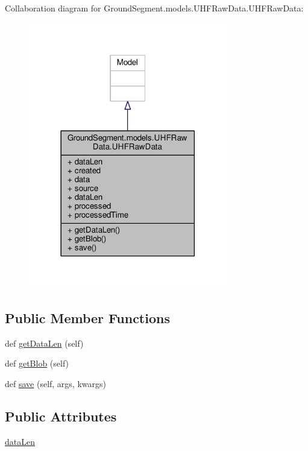 Collaboration diagram for Ground\+Segment.\+models.\+U\+H\+F\+Raw\+Data.\+U\+H\+F\+Raw\+Data\+:\nopagebreak
\begin{figure}[H]
\begin{center}
\leavevmode
\includegraphics[width=246pt]{class_ground_segment_1_1models_1_1_u_h_f_raw_data_1_1_u_h_f_raw_data__coll__graph}
\end{center}
\end{figure}
\subsection*{Public Member Functions}
\begin{DoxyCompactItemize}
\item 
def \hyperlink{class_ground_segment_1_1models_1_1_u_h_f_raw_data_1_1_u_h_f_raw_data_a7aa5473e76f0b6f3784b74d58a1a3882}{get\+Data\+Len} (self)
\item 
def \hyperlink{class_ground_segment_1_1models_1_1_u_h_f_raw_data_1_1_u_h_f_raw_data_a80c5fc99c33923e60a09ed948c70f1eb}{get\+Blob} (self)
\item 
def \hyperlink{class_ground_segment_1_1models_1_1_u_h_f_raw_data_1_1_u_h_f_raw_data_a0ffa42aeb51aede4dba8bf88afa8e6b8}{save} (self, args, kwargs)
\end{DoxyCompactItemize}
\subsection*{Public Attributes}
\begin{DoxyCompactItemize}
\item 
\hyperlink{class_ground_segment_1_1models_1_1_u_h_f_raw_data_1_1_u_h_f_raw_data_aff0c88499e748d48a0cd7faaf99a0a83}{data\+Len}
\end{DoxyCompactItemize}
